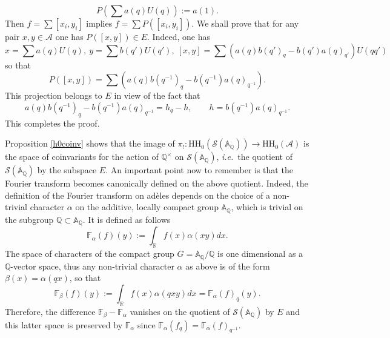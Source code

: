 \documentclass{pspum-l}
\theoremstyle{definition}
\theoremstyle{remark}
\numberwithin{equation}{section}
\newcommand{\ie}{{\it i.e.\/}\ }
\def\A{{\mathbb A}}
\def\F{{\mathbb F}}
\def\Q{{\mathbb Q}}
\def\R{{\mathbb R}}
\def\cA{{\mathcal A}}
\def\cS{{\mathcal S}}
\def\fourier{\F}
\def\HH{\text{HH}}
\begin{document}
\[
P\left( \sum a(q)U(q)\right) :=a(1).
\]
Then  $f=\sum [x_i,y_i]$ implies $f=\sum P( [x_i,y_i])$. We shall prove that for any pair $x, y \in \cA$ one has $P( [x,y])\in E$. Indeed, one has 
\[
x=\sum a(q)U(q), \ y=\sum b(q') U(q'),\ [x,y]=\sum (a(q)b(q')_q-b(q')a(q)_{q'})U(qq')
\]
so that 
\[
P( [x,y])=\sum (a(q)b(q^{-1})_q-b(q^{-1})a(q)_{q^{-1}}).
\]
This projection  belongs to $E$ in view of the fact that
\[
a(q)b(q^{-1})_q-b(q^{-1})a(q)_{q^{-1}}=h_q-h, \qquad h=b(q^{-1})a(q)_{q^{-1}}.
\]
This completes the proof.\endproof 

Proposition \ref{h0coinv} shows that the image of  $\pi_!: \HH_0(\cS(\A_\Q))\to \HH_0(\cA)$ is the space of coinvariants for the action of $\Q^\times$ on $\cS(\A_\Q)$, \ie the quotient of $\cS(\A_\Q)$ by the subspace $E$.\newline
 An important point now to remember is  that the Fourier transform becomes canonically defined on the above quotient. Indeed, the definition of the Fourier transform on ad\`eles depends on the choice of a non-trivial character $\alpha$ on the additive, locally compact  group $\A_\Q$, which is trivial on the subgroup $\Q\subset \A_\Q$. It is  defined as follows
 \begin{equation*}\label{fourier1}
\fourier_\alpha(f)(y):= \int_\R f(x)\alpha(xy) dx.
\end{equation*}
 The space of characters of the compact group $G=\A_\Q/\Q$ is one dimensional as a $\Q$-vector space, thus any non-trivial character $\alpha$ as above is of the form $\beta(x)=\alpha(qx)$, so that 
 \begin{equation*}\label{fourier2}
\fourier_\beta(f)(y):= \int_\R f(x)\alpha(qxy) dx=\fourier_\alpha(f)_q(y).
\end{equation*}
Therefore, the difference $\fourier_\beta-\fourier_\alpha$ vanishes on the quotient of $\cS(\A_\Q)$ by $E$ and this latter space is preserved by $\fourier_\alpha$ since  $\fourier_\alpha(f_q)=\fourier_\alpha(f)_{q^{-1}}$. 
\end{document}
